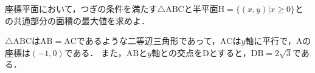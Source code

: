 座標平面において，つぎの条件を満たす$\triangle \mathrm{ABC}$と半平面$\mathrm{H}=\{(x,y)|x\ge 0\}$との共通部分の面積の最大値を求めよ．

$\triangle \mathrm{ABC}$は$\mathrm{AB}=\mathrm{AC}$であるような二等辺三角形であって，$\mathrm{AC}$は$y$軸に平行で，$\mathrm{A}$の座標は$(-1,0)$である．
また，$\mathrm{AB}$と$y$軸との交点を$\mathrm{D}$とすると，$\mathrm{DB}=2\sqrt{3}$である．
